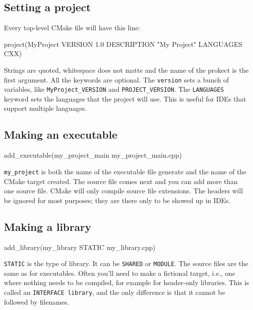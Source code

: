 \subsection{Setting a project}
Every top-level CMake file will have this line:
\begin{neonlisting}[language=C++]{}
    project(MyProject VERSION 1.0
        DESCRIPTION "My Project"
        LANGUAGES CXX)

\end{neonlisting}

Strings are quoted, whitespace does not matte and the name of the prokect is the first argument.
All the keywords are optional. The \texttt{version} sets a bunch of variables, like \texttt{MyProject\_VERSION} 
and \texttt{PROJECT\_VERSION}. The \texttt{LANGUAGES} keyword sets the languages that the project will use. This is useful for IDEs that support multiple languages.

\subsection{Making an executable}

\begin{neonlisting}[language=C++]{}
add_executable(my_project_main my_project_main.cpp)
\end{neonlisting}

\texttt{my\_project} is both the name of the executable file generate and the name of the CMake target created.
The source file comes next and you can add more than one source file. CMake will only compile source file extensions. 
The headers will be ignored for most purposes; they are there only to be showed up in IDEs.

\subsection{Making a library}

\begin{neonlisting}[language=C++]{}
add_library(my_library STATIC my_library.cpp)
\end{neonlisting}

\texttt{STATIC} is the type of library. It can be \texttt{SHARED} or \texttt{MODULE}. The source files are the same as for executables.
Often you'll need to make a fictional target, i.e., one where nothing needs to be compiled, for example for header-only libraries. This is called an \texttt{INTERFACE library},
and the only difference is that it cannot be followed by filenames.

